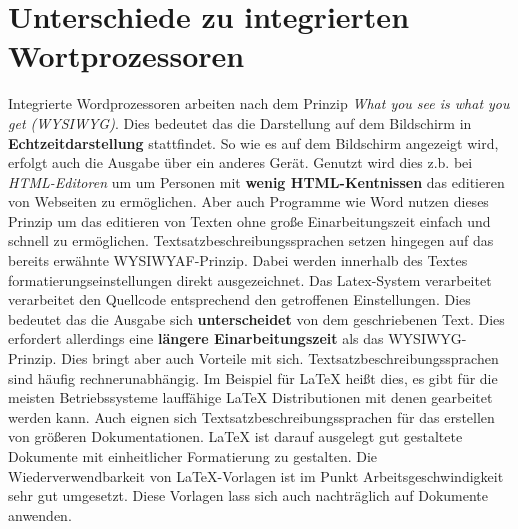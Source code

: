 \section{Unterschiede zu integrierten Wortprozessoren}
Integrierte Wordprozessoren arbeiten nach dem Prinzip \textit{What you see is what you get (WYSIWYG)}. Dies bedeutet das die Darstellung auf dem Bildschirm in \textbf{Echtzeitdarstellung} stattfindet. So wie es auf dem Bildschirm angezeigt wird, erfolgt auch die Ausgabe über ein anderes Gerät. Genutzt wird dies z.b. bei \textit{HTML-Editoren} um um Personen mit \textbf{wenig HTML-Kentnissen} das editieren von Webseiten zu ermöglichen. Aber auch Programme wie Word nutzen dieses Prinzip um das editieren von Texten ohne große Einarbeitungszeit einfach und schnell zu ermöglichen.
Textsatzbeschreibungssprachen setzen hingegen auf das bereits erwähnte WYSIWYAF-Prinzip. Dabei werden innerhalb des Textes formatierungseinstellungen direkt ausgezeichnet. Das Latex-System verarbeitet verarbeitet den Quellcode entsprechend den getroffenen Einstellungen. Dies bedeutet das die Ausgabe sich \textbf{unterscheidet} von dem geschriebenen Text. Dies erfordert allerdings eine \textbf{längere Einarbeitungszeit} als das WYSIWYG-Prinzip.
Dies bringt aber auch Vorteile mit sich. Textsatzbeschreibungssprachen sind häufig rechnerunabhängig. Im Beispiel für LaTeX heißt dies, es gibt für die meisten Betriebssysteme lauffähige LaTeX Distributionen mit denen gearbeitet werden kann. Auch eignen sich Textsatzbeschreibungssprachen für das erstellen von größeren Dokumentationen. LaTeX ist darauf ausgelegt gut gestaltete Dokumente mit einheitlicher Formatierung zu gestalten. Die Wiederverwendbarkeit von LaTeX-Vorlagen ist im Punkt Arbeitsgeschwindigkeit sehr gut umgesetzt. Diese Vorlagen lass sich auch nachträglich auf Dokumente anwenden.\nocite{schweitze:2013} \nocite{hommel:2010}

